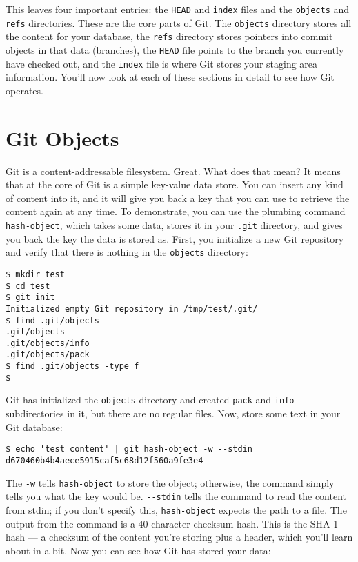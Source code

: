 \documentclass[a4paper]{book}
\newcounter{tab}[chapter]
\begin{document}
This leaves four important entries: the \texttt{HEAD} and \texttt{index} files and the \texttt{objects} and \texttt{refs} directories. These are the core parts of Git. The \texttt{objects} directory stores all the content for your database, the \texttt{refs} directory stores pointers into commit objects in that data (branches), the \texttt{HEAD} file points to the branch you currently have checked out, and the \texttt{index} file is where Git stores your staging area information. You'll now look at each of these sections in detail to see how Git operates.

\section{Git Objects}\label{git-objects}

Git is a content-addressable filesystem. Great. What does that mean? It means that at the core of Git is a simple key-value data store. You can insert any kind of content into it, and it will give you back a key that you can use to retrieve the content again at any time. To demonstrate, you can use the plumbing command \texttt{hash-object}, which takes some data, stores it in your \texttt{.git} directory, and gives you back the key the data is stored as. First, you initialize a new Git repository and verify that there is nothing in the \texttt{objects} directory:

\begin{shaded}\begin{verbatim}
$ mkdir test
$ cd test
$ git init
Initialized empty Git repository in /tmp/test/.git/
$ find .git/objects
.git/objects
.git/objects/info
.git/objects/pack
$ find .git/objects -type f
$
\end{verbatim}\end{shaded}

Git has initialized the \texttt{objects} directory and created \texttt{pack} and \texttt{info} subdirectories in it, but there are no regular files. Now, store some text in your Git database:

\begin{shaded}\begin{verbatim}
$ echo 'test content' | git hash-object -w --stdin
d670460b4b4aece5915caf5c68d12f560a9fe3e4
\end{verbatim}\end{shaded}

The \texttt{-w} tells \texttt{hash-object} to store the object; otherwise, the command simply tells you what the key would be. \texttt{-{}-stdin} tells the command to read the content from stdin; if you don't specify this, \texttt{hash-object} expects the path to a file. The output from the command is a 40-character checksum hash. This is the SHA-1 hash --- a checksum of the content you're storing plus a header, which you'll learn about in a bit. Now you can see how Git has stored your data:
\end{document}
